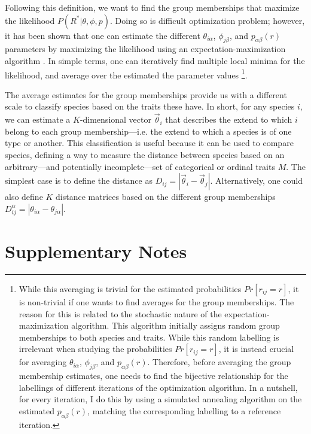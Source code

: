 \documentclass[11pt, a4paper]{article}
\begin{document}
Following this definition, we want to find the group memberships that maximize the likelihood $P\left(R^{*}|\theta, \phi, p\right)$. Doing so is difficult optimization problem; however, it has been shown that one can estimate the different $\theta_{i\alpha}$, $\phi_{j\beta}$, and $p_{\alpha\beta}\left(r\right)$ parameters by maximizing the likelihood using an expectation-maximization algorithm \citep{godoy-loriteAccurateScalableSocial2016, tarres-deulofeuTensorialBipartiteBlock2019}. In simple terms, one can iteratively find multiple local minima for the likelihood, and average over the estimated the parameter values \citep{godoy-loriteAccurateScalableSocial2016}\footnote[2]{
While this averaging is trivial for the estimated probabilities $Pr[r_{ij}=r]$, it is non-trivial if one wants to find averages for the group memberships. The reason for this is related to the stochastic nature of the expectation-maximization algorithm. This algorithm initially assigns random group memberships to both species and traits. While this random labelling is irrelevant when studying the probabilities $Pr[r_{ij}=r]$, it is instead crucial for averaging $\theta_{i\alpha}$, $\phi_{j\beta}$, and $p_{\alpha\beta}\left(r\right)$. Therefore, before averaging the group membership estimates, one needs to find the bijective relationship for the labellings of different iterations of the optimization algorithm. In a nutshell, for every iteration, I do this by using a simulated annealing algorithm on the estimated $p_{\alpha\beta}\left(r\right)$, matching the corresponding labelling to a reference iteration.}. 

The average estimates for the group memberships provide us with a different scale to classify species based on the traits these have. In short, for any species $i$, we can estimate a $K$-dimensional vector $\vec{\theta}_{i}$ that describes the extend to which $i$ belong to each group membership---i.e. the extend to which a species is of one type or another. This classification is useful because it can be used to compare species, defining a way to measure the distance between species based on an arbitrary---and potentially incomplete---set of categorical or ordinal traits $M$. The simplest case is to define the distance as $D_{ij} = |\vec{\theta}_{i}-\vec{\theta}_{j}|$. Alternatively, one could also define $K$ distance matrices based on the different group memberships $D^{\alpha}_{ij} = |\theta_{i\alpha}-\theta_{j\alpha}|$.

\section*{Supplementary Notes}
\end{document}
